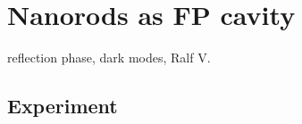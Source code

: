 

\chapter{Nanorods as FP cavity}



reflection phase, dark modes, Ralf V.



\section{Experiment}






\printbibliography[segment=\therefsegment,heading=subbibliography]
